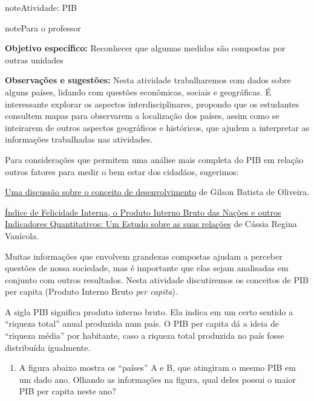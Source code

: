 \begin{sphinxadmonition}{note}{Atividade: PIB}

\begin{sphinxadmonition}{note}{Para o professor}

\textbf{Objetivo específico:} Reconhecer que algumas medidas são compostas por outras unidades

\textbf{Observações e sugestões:}
Nesta atividade trabalharemos com dados sobre alguns países, lidando com questões econômicas, sociais e geográficas.  É interessante explorar os aspectos interdisciplinares, propondo que os estudantes consultem mapas para observarem a localização dos países, assim como se inteirarem de outros aspectos geográficos e históricos, que ajudem a interpretar as informações trabalhadas nas atividades.

Para considerações que permitem uma análise mais completa do PIB em relação outros fatores para medir o bem estar dos cidadãos, sugerimos:

\href{https://revistafae.fae.edu/revistafae/article/view/477}{Uma discussão sobre o conceito de desenvolvimento} de Gilson Batista de Oliveira.

\href{https://www.aedb.br/seget/arquivos/artigos08/323\_Indice\%20de\%20Felicidade\%20Interna\_SEGeT.pdf}{Índice de Felicidade Interna, o Produto Interno Bruto das Nações e outros Indicadores Quantitativos: Um Estudo sobre as suas relações} de Cássia Regina Vanícola.
\end{sphinxadmonition}

Muitas informações que envolvem grandezas compostas ajudam a perceber questões de nossa sociedade, mas é importante que elas sejam analisadas em conjunto com outros resultados. Nesta atividade discutiremos os conceitos de PIB per capita (Produto Interno Bruto \textit{per capita}).

A sigla PIB significa produto interno bruto. Ela  indica em um certo sentido a  “riqueza total” anual  produzida num país. O PIB per capita dá a ideia de “riqueza média” por habitante, caso a riqueza total produzida no país fosse distribuída  igualmente.
\begin{enumerate}
\item {} 
A figura abaixo mostra os “países” A e B, que atingiram o mesmo PIB  em um dado ano. Olhando as informações na figura, qual deles possui o maior PIB per capita  neste ano?

\begin{figure}[H]
\centering
\capstart


\end{figure}
\end{enumerate}
\end{sphinxadmonition}
